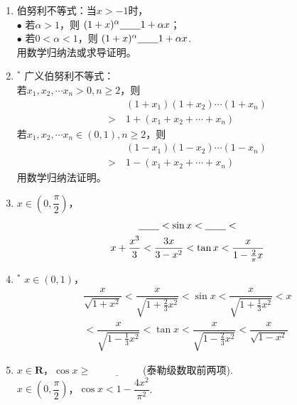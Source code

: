 \documentclass{article}
\newif\ifte
\renewcommand\leq\leqslant
\renewcommand\geq\geqslant
\begin{document}
\begin{multicols}{2}
\begin{enumerate}[leftmargin=20pt]
\item 伯努利不等式：当$ x>-1 $时，\\
$ \bullet $ 若$ \alpha>1 $，则 $ (1+x)^{\alpha} \underline{\ 
    \ifte \geq \else \hspace{0.5cm} \fi\ } 1+\alpha x  $；\\
$ \bullet $ 若$ 0<\alpha<1 $，则 $ (1+x)^{\alpha} \underline{\ 
    \ifte \leq \else \hspace{0.5cm} \fi\ } 1+\alpha x $. \\
用数学归纳法或求导证明。

\item $^*$ 广义伯努利不等式：\\
若$ x_1,x_2,\cdots x_n >0, n\geq 2 $，则
\begin{align*}
     &\ (1+x_1)(1+x_2)\cdots (1+x_n)\\
    >&\ 1+(x_1+x_2+\cdots +x_n) 
\end{align*}
若$ x_1,x_2,\cdots x_n \in (0,1), n\geq 2 $，则
\begin{align*}
     &\ (1-x_1)(1-x_2)\cdots (1-x_n)\\
    >&\ 1-(x_1+x_2+\cdots +x_n) 
\end{align*}
用数学归纳法证明。

\item $ x\in \left( 0,\dfrac{\pi}{2}\right) $，
\begin{gather*}
    \underline{\ \ifte \dfrac{2}{\pi}x\else \hspace{0.5cm} \fi\ }
    <\sin x < \underline{\ \ifte x\else \hspace{0.5cm} \fi\ } <
    \\ x+\dfrac{x^3}{3} 
    <\dfrac{3x}{3-x^2}<\tan x <\dfrac{x}{1-\frac{2}{\pi}x}
\end{gather*} 

\item $^*$ $ x\in (0,1) $，
\begin{gather*}
    \dfrac{x}{\sqrt{1+x^2}}<\dfrac{x}{\sqrt{1+\frac{2}{3}x^2}}<
    \sin x<\dfrac{x}{\sqrt{1+\frac{1}{3}x^2}}<x \\
     <\dfrac{x}{\sqrt{1-\frac{1}{3}x^2}}<
    \tan x<\dfrac{x}{\sqrt{1-\frac{2}{3}x^2}}<
    \dfrac{x}{\sqrt{1-x^2}}
\end{gather*} 

\item $ x\in \textbf{R} $，$ \cos x\geq \underline{\ 
    \ifte 1-\dfrac{1}{2}x^2 \else \hspace{2cm} \fi\ } $(泰勒级数取前两项). \\
$ x\in \left(0,\dfrac{\pi}{2}\right) $，$ \cos x <1-\dfrac{4x^2}{\pi^2} $. 


\end{enumerate}
\end{multicols}
\end{document}
